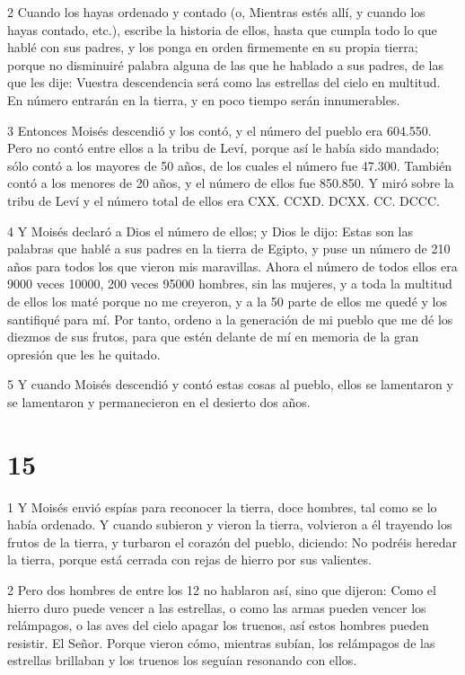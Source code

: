 \par 2 Cuando los hayas ordenado y contado (o, Mientras estés allí, y cuando los hayas contado, etc.), escribe la historia de ellos, hasta que cumpla todo lo que hablé con sus padres, y los ponga en orden firmemente en su propia tierra; porque no disminuiré palabra alguna de las que he hablado a sus padres, de las que les dije: Vuestra descendencia será como las estrellas del cielo en multitud. En número entrarán en la tierra, y en poco tiempo serán innumerables.

\par 3 Entonces Moisés descendió y los contó, y el número del pueblo era 604.550. Pero no contó entre ellos a la tribu de Leví, porque así le había sido mandado; sólo contó a los mayores de 50 años, de los cuales el número fue 47.300. También contó a los menores de 20 años, y el número de ellos fue 850.850. Y miró sobre la tribu de Leví y el número total de ellos era CXX. CCXD. DCXX. CC. DCCC.

\par 4 Y Moisés declaró a Dios el número de ellos; y Dios le dijo: Estas son las palabras que hablé a sus padres en la tierra de Egipto, y puse un número de 210 años para todos los que vieron mis maravillas. Ahora el número de todos ellos era 9000 veces 10000, 200 veces 95000 hombres, sin las mujeres, y a toda la multitud de ellos los maté porque no me creyeron, y a la 50 parte de ellos me quedé y los santifiqué para mí. Por tanto, ordeno a la generación de mi pueblo que me dé los diezmos de sus frutos, para que estén delante de mí en memoria de la gran opresión que les he quitado.

\par 5 Y cuando Moisés descendió y contó estas cosas al pueblo, ellos se lamentaron y se lamentaron y permanecieron en el desierto dos años.

\chapter{15}

\par 1 Y Moisés envió espías para reconocer la tierra, doce hombres, tal como se lo había ordenado. Y cuando subieron y vieron la tierra, volvieron a él trayendo los frutos de la tierra, y turbaron el corazón del pueblo, diciendo: No podréis heredar la tierra, porque está cerrada con rejas de hierro por sus valientes.

\par 2 Pero dos hombres de entre los 12 no hablaron así, sino que dijeron: Como el hierro duro puede vencer a las estrellas, o como las armas pueden vencer los relámpagos, o las aves del cielo apagar los truenos, así estos hombres pueden resistir. El Señor. Porque vieron cómo, mientras subían, los relámpagos de las estrellas brillaban y los truenos los seguían resonando con ellos.

